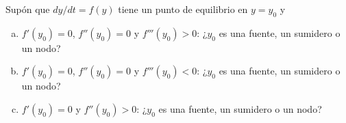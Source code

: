 \documentclass[12pt]{exam}
\begin{document}
\begin{questions}
     \question
     Supón que $dy/dt=f(y)$ tiene un punto de equilibrio en $y=y_0$ y
     
     \begin{enumerate}[a)]
         \item $f'(y_0)=0$, $f''(y_0)=0$ y $f'''(y_0)>0$: ¿$y_0$ es una fuente, un sumidero o un nodo?
         \item $f'(y_0)=0$, $f''(y_0)=0$ y $f'''(y_0)<0$: ¿$y_0$ es una fuente, un sumidero o un nodo?
         \item $f'(y_0)=0$ y $f''(y_0)>0$: ¿$y_0$ es una fuente, un sumidero o un nodo?
     \end{enumerate}



     

        \end{questions}


    
    \newpage


\end{document}
